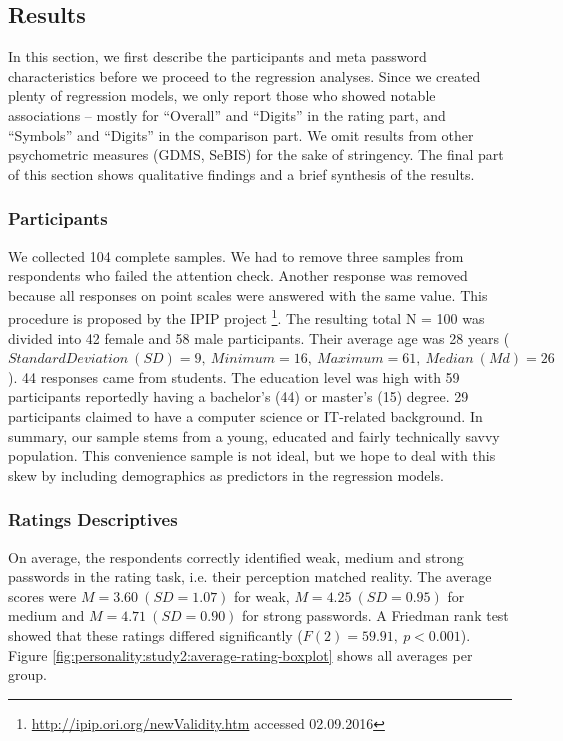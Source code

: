 \subsection{Results}
In this section, we first describe the participants and meta password characteristics before we proceed to the regression analyses. Since we created plenty of regression models, we only report those who showed notable associations -- mostly for ``Overall'' and ``Digits'' in the rating part, and ``Symbols'' and ``Digits'' in the comparison part. We omit results from other psychometric measures (GDMS, SeBIS) for the sake of stringency. The final part of this section shows qualitative findings and a brief synthesis of the results. 

\subsubsection{Participants}
We collected 104 complete samples. We had to remove three samples from respondents who failed the attention check. Another response was removed because all responses on point scales were answered with the same value. This procedure is proposed by the IPIP project \footnote{\url{http://ipip.ori.org/newValidity.htm} accessed 02.09.2016}. The resulting total N = 100 was divided into 42 female and 58 male participants. Their average age was 28 years ($Standard Deviation~(SD) = 9,~Minimum = 16,~Maximum = 61,~Median~(Md) = 26$). 44 responses came from students. The education level was high with 59 participants reportedly having a bachelor's (44) or master's (15) degree. 29 participants claimed to have a computer science or IT-related background. In summary, our sample stems from a young, educated and fairly technically savvy population. This convenience sample is not ideal, but we hope to deal with this skew by including demographics as predictors in the regression models.

\subsubsection{Ratings Descriptives}
On average, the respondents correctly identified weak, medium and strong passwords in the rating task, i.e. their perception matched reality. The average scores were $M=3.60~(SD=1.07)$ for weak, $M=4.25~(SD=0.95)$ for medium and $M=4.71~(SD=0.90)$ for strong passwords. A Friedman rank test showed that these ratings differed significantly ($F(2)=59.91,~p < 0.001$). Figure \ref{fig:personality:study2:average-rating-boxplot} shows all averages per group.


